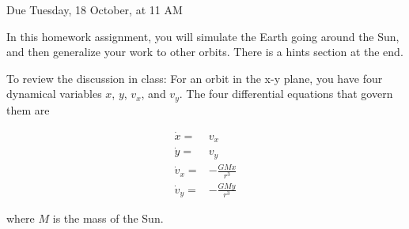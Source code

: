 \documentclass[12pt]{article}
\begin{document}
\Large
\centerline{}
\centerline{Due Tuesday, 18 October, at 11 AM}
\normalsize

In this homework assignment, you will simulate the Earth going around the Sun,
and then generalize your work to other orbits. There is a hints section at the end.

To review the discussion in class: 
For an orbit in the x-y plane, you have four dynamical variables $x$, $y$,
$v_x$, and $v_y$. The four differential equations that govern them are

\begin{align}
\dot x =& v_x\\
\dot y =& v_y\\
\dot v_x =& -\frac{GMx}{r^3} \\
\dot v_y =& -\frac{GMy}{r^3} 
\end{align}

where $M$ is the mass of the Sun.
\end{document}
